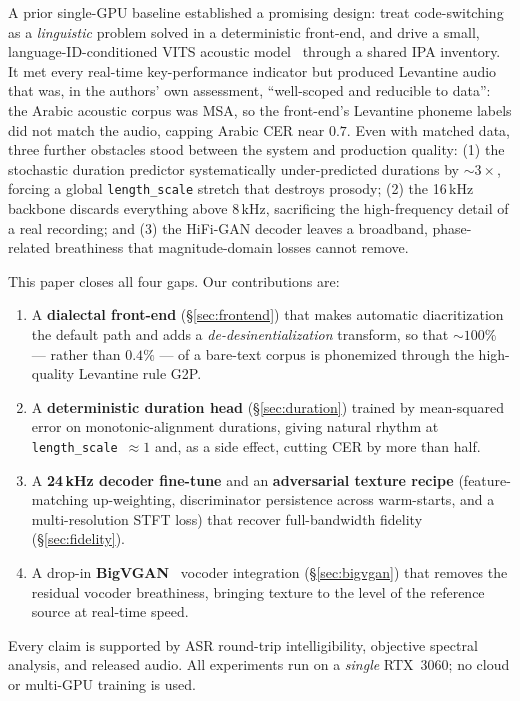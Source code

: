 \documentclass[10pt,twocolumn]{article}
\begin{document}
A prior single-GPU baseline established a promising design: treat code-switching as a
\emph{linguistic} problem solved in a deterministic front-end, and drive a small,
language-ID-conditioned VITS acoustic model~\cite{vits} through a shared IPA inventory. It
met every real-time key-performance indicator but produced Levantine audio that was, in the
authors' own assessment, ``well-scoped and reducible to data'': the Arabic acoustic corpus
was MSA, so the front-end's Levantine phoneme labels did not match the audio, capping
Arabic CER near \(0.7\). Even with matched data, three further obstacles stood between the
system and production quality: (1) the stochastic duration predictor systematically
under-predicted durations by \(\sim\!3\times\), forcing a global \texttt{length\_scale}
stretch that destroys prosody; (2) the 16\,kHz backbone discards everything above 8\,kHz,
sacrificing the high-frequency detail of a real recording; and (3) the HiFi-GAN decoder
leaves a broadband, phase-related breathiness that magnitude-domain losses cannot remove.

This paper closes all four gaps. Our contributions are:
\begin{enumerate}
\item A \textbf{dialectal front-end} (\S\ref{sec:frontend}) that makes automatic
diacritization the default path and adds a \emph{de-desinentialization} transform, so that
\(\sim\!100\%\) --- rather than \(0.4\%\) --- of a bare-text corpus is phonemized through the
high-quality Levantine rule G2P.
\item A \textbf{deterministic duration head} (\S\ref{sec:duration}) trained by
mean-squared error on monotonic-alignment durations, giving natural rhythm at
\texttt{length\_scale}~\(\approx\!1\) and, as a side effect, cutting CER by more than half.
\item A \textbf{24\,kHz decoder fine-tune} and an \textbf{adversarial texture recipe}
(feature-matching up-weighting, discriminator persistence across warm-starts, and a
multi-resolution STFT loss) that recover full-bandwidth fidelity (\S\ref{sec:fidelity}).
\item A drop-in \textbf{BigVGAN}~\cite{bigvgan} vocoder integration (\S\ref{sec:bigvgan})
that removes the residual vocoder breathiness, bringing texture to the level of the reference
source at real-time speed.
\end{enumerate}
Every claim is supported by ASR round-trip intelligibility, objective spectral analysis, and
released audio. All experiments run on a \emph{single} RTX~3060; no cloud or multi-GPU
training is used.
\end{document}
